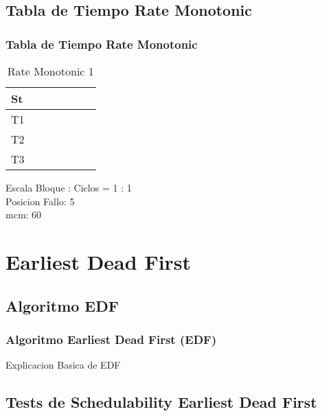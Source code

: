\documentclass[xcolor=table]{beamer}
\begin{document}
\subsection{Tabla de Tiempo  Rate Monotonic } 

\begin{frame} 
\frametitle{Tabla de Tiempo  Rate Monotonic } 
\begin{table} 
\centering 
\begin{tabular}{|l|l|l|l|l|l|l|} 
\hline 
St & \cellcolor{green} & \cellcolor{green} & \cellcolor{green} & \cellcolor{green} & \cellcolor{green} & \cellcolor{red} \\ \hline 
T1 & \cellcolor{blue} & & & \cellcolor{blue} & & \\ \hline 
T2 & & & & & & \\ \hline 
T3 & & \cellcolor{cyan} & \cellcolor{cyan} & & \cellcolor{cyan} & \cellcolor{cyan} \\ \hline 
\end{tabular} 
\caption{ Rate Monotonic 1 } 
\end{table} 
Escala Bloque : Ciclos = 1 : 1 \\ 
Posicion Fallo:  5 \\ 
mcm:  60 \\ 
\end{frame} 


\section{Earliest Dead First}

\subsection{Algoritmo EDF}

\begin{frame} 
\frametitle{Algoritmo Earliest Dead First (EDF)} 
Explicacion Basica de EDF \\
\end{frame}

\subsection{Tests de Schedulability  Earliest Dead First } 
\end{document}
